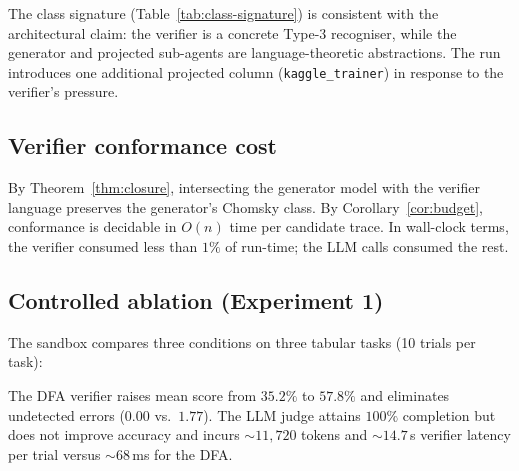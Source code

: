 The class signature (Table~\ref{tab:class-signature}) is consistent
with the architectural claim: the verifier is a concrete Type-3
recogniser, while the generator and projected sub-agents are
language-theoretic abstractions.  The run introduces one additional
projected column (\texttt{kaggle\_trainer}) in response to the
verifier's pressure.

\subsection{Verifier conformance cost}

By Theorem~\ref{thm:closure}, intersecting the generator model with
the verifier language preserves the generator's Chomsky class.  By
Corollary~\ref{cor:budget}, conformance is decidable in $O(n)$ time
per candidate trace.  In wall-clock terms, the verifier consumed
less than $1\%$ of run-time; the LLM calls consumed the rest.

\subsection{Controlled ablation (Experiment 1)}

The sandbox compares three conditions on three tabular tasks
(10 trials per task):

\begin{table}[ht]
\centering
\caption{Verifier ablation over three sandbox tasks ($n{=}10$).}
\label{tab:ablation_main}
\end{table}

The DFA verifier raises mean score from $35.2\%$ to $57.8\%$ and
eliminates undetected errors ($0.00$ vs.\ $1.77$).  The LLM judge
attains $100\%$ completion but does not improve accuracy and incurs
$\sim\!11{,}720$ tokens and $\sim\!14.7$\,s verifier latency per
trial versus $\sim\!68$\,ms for the DFA.

